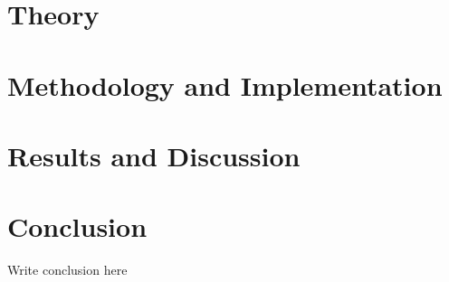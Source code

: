 \documentclass[UKenglish]{ifimaster}  %
\begin{document}
\part{Theory}                    %





\part{Methodology and Implementation}


 
\part{Results and Discussion}






\part{Conclusion}
Write conclusion here

\backmatter{}
\printbibliography
\end{document}
